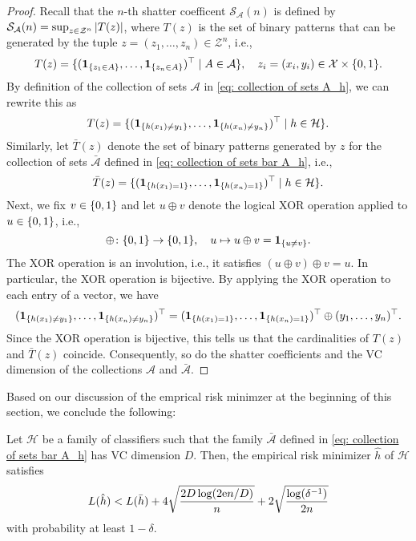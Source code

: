 \begin{proof}
Recall that the $n$-th shatter coefficent $\mathcal{S}_{\mathcal{A}}(n)$ is defined by $\mathcal{S}_{\mathcal{A}}(n) = \sup_{z \in \mathcal{Z}^n} \abs{T(z)}$, where $T(z)$ is the set of binary patterns that can be generated by the tuple $z = (z_1, \dots, z_n) \in \mathcal{Z}^n$, i.e.,
\[
    T(z) = \{(\indSet{z_1 \in A}, \dots, \indSet{z_n \in A})^{\top} \with A \in \mathcal{A}\}, \quad z_i = (x_i, y_i) \in \mathcal{X} \times \set{0, 1}.
\]
By definition of the collection of sets $\mathcal{A}$ in \eqref{eq: collection of sets A_h}, we can rewrite this as
\[
    T(z) = \{(\indSet{h(x_1) \neq y_1}, \dots, \indSet{h(x_n) \neq y_n})^{\top} \with h \in \mathcal{H}\}.
\]
Similarly, let $\bar{T}(z)$ denote the set of binary patterns generated by $z$ for the collection of sets $\bar{\mathcal{A}}$ defined in \eqref{eq: collection of sets bar A_h}, i.e.,
\[
    \bar{T}(z) = \{(\indSet{h(x_1) = 1}, \dots, \indSet{h(x_n) = 1})^{\top} \with h \in \mathcal{H}\}.
\]
Next, we fix $v \in \set{0, 1}$ and let $u \oplus v$ denote the logical XOR operation applied to $u \in \set{0, 1}$, i.e.,
\[
    \oplus \colon \set{0, 1} \to \set{0, 1}, \quad u \mapsto u \oplus v = \indSet{u \neq v}.
\]
The XOR operation is an involution, i.e., it satisfies $(u \oplus v) \oplus v = u$. In particular, the XOR operation is bijective. By applying the XOR operation to each entry of a vector, we have
\[
    (\indSet{h(x_1) \neq y_1}, \dots, \indSet{h(x_n) \neq y_n})^{\top} = (\indSet{h(x_1) = 1}, \dots, \indSet{h(x_n) = 1})^{\top} \oplus (y_1, \dots, y_n)^{\top}.
\]
Since the XOR operation is bijective, this tells us that the cardinalities of $T(z)$ and $\bar{T}(z)$ coincide. Consequently, so do the shatter coefficients and the VC dimension of the collections $\mathcal{A}$ and $\bar{\mathcal{A}}$.
\end{proof}

Based on our discussion of the emprical risk minimzer at the beginning of this section, we conclude the following:

\begin{corollary}
Let $\mathcal{H}$ be a family of classifiers such that the family $\bar{\mathcal{A}}$ defined in \eqref{eq: collection of sets bar A_h} has VC dimension $D$. Then, the empirical risk minimizer $\hat{h}$ of $\mathcal{H}$ satisfies
\[
    L(\hat{h}) < L(\bar{h}) + 4 \sqrt{\frac{2D \log(2 \mathrm{e} n / D)}{n}} + 2 \sqrt{\frac{\log(\delta^{-1})}{2n}}
\]
with probability at least $1 - \delta$.
\end{corollary}
